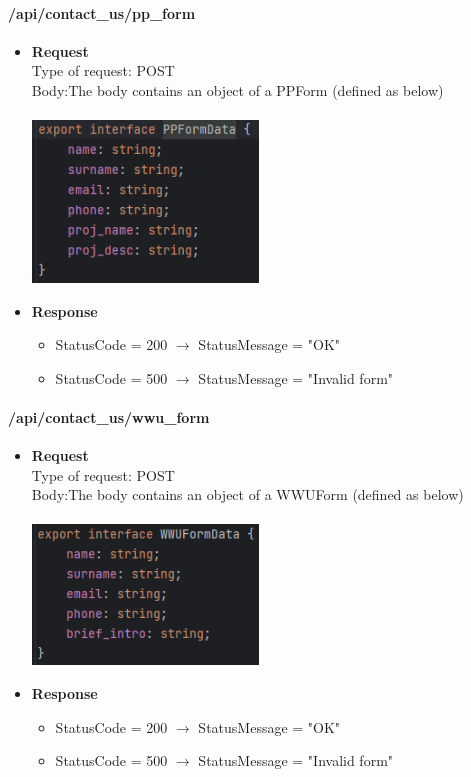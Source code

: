 \documentclass[11pt, letterpaper]{article}
\begin{document}
\paragraph{/api/contact\_us/pp\_form}
\begin{itemize}
    \item \textbf{Request} \\ Type of request: POST \\ Body:The body contains an object of a PPForm (defined as below) \\ \\
            \includegraphics[width=6cm]{images/API/PPForm.png}
    \item \textbf{Response} \begin{itemize}
        \item StatusCode = 200 $\rightarrow$ StatusMessage = "OK"
        \item StatusCode = 500 $\rightarrow$ StatusMessage = "Invalid form"
    \end{itemize} 
\end{itemize}

\paragraph{/api/contact\_us/wwu\_form}
\begin{itemize}
    \item \textbf{Request} \\ Type of request: POST \\ Body:The body contains an object of a WWUForm (defined as below) \\ \\
            \includegraphics[width=6cm]{images/API/WWUForm.png}
    \item \textbf{Response} \begin{itemize}
        \item StatusCode = 200 $\rightarrow$ StatusMessage = "OK"
        \item StatusCode = 500 $\rightarrow$ StatusMessage = "Invalid form"
    \end{itemize} 
\end{itemize}
\end{document}
